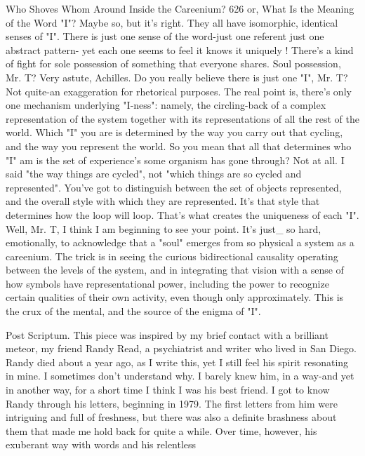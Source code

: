 Who Shoves Whom Around Inside the Careenium?                                         626
or, What Is the Meaning of the Word "I"?
\tortoise Maybe so, but it's right. They all have isomorphic, identical senses of
  "I". There is just one sense of the word-just one referent just one abstract pattern-
  yet each one seems to feel it knows it uniquely ! There's a kind of fight for sole
  possession of something that everyone shares.
\achilles Soul possession, Mr. T?
\tortoise Very astute, Achilles.
\achilles Do you really believe there is just one "I", Mr. T?
\tortoise Not quite-an exaggeration for rhetorical purposes. The real point is,
  there's only one mechanism underlying "I-ness": namely, the circling-back of a
  complex representation of the system together with its representations of all the
  rest of the world. Which "I" you are is determined by the way you carry out that
  cycling, and the way you represent the world.
\achilles So you mean that all that determines who "I" am is the set of
  experience's some organism has gone through?
\tortoise Not at all. I said "the way things are cycled", not "which things are so
  cycled and represented". You've got to distinguish between the set of objects
  represented, and the overall style with which they are represented. It's that style
  that determines how the loop will loop. That's what creates the uniqueness of each
  "I".
\achilles Well, Mr. T, I think I am beginning to see your point. It's just\_ so hard,
  emotionally, to acknowledge that a "soul" emerges from so physical a system as a
  careenium.
\tortoise The trick is in seeing the curious bidirectional causality operating
  between the levels of the system, and in integrating that vision with a sense of how
  symbols have representational power, including the power to recognize certain
  qualities of their own activity, even though only approximately. This is the crux of
  the mental, and the source of the enigma of "I".


Post Scriptum.
    This piece was inspired by my brief contact with a brilliant meteor, my friend
Randy Read, a psychiatrist and writer who lived in San Diego. Randy died about a
year ago, as I write this, yet I still feel his spirit resonating in mine. I sometimes don't
understand why. I barely knew him, in a way-and yet in another way, for a short time
I think I was his best friend.
    I got to know Randy through his letters, beginning in 1979. The first letters from
him were intriguing and full of freshness, but there was also a definite brashness
about them that made me hold back for quite a while. Over time, however, his
exuberant way with words and his relentless




